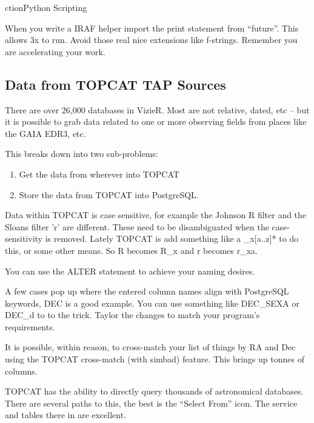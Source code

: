 ction{Python Scripting}

When you write a IRAF helper  import the
print statement from ``future''. This allows 3x to run. Avoid those
real nice extensions like f-strings.  Remember you are accelerating
your work.


\subsection{Data from TOPCAT TAP Sources}

There are over 26,000 databases in VizieR. Most are not
relative, dated, etc -- but it is possible to grab
data related to one or more observing fields from places
like the GAIA EDR3, etc. 

This breaks down into two sub-problems:

\vspace{-.15cm}
\begin{enumerate}\addtolength{\itemsep}{-0.5\baselineskip}
   \item   Get the data from wherever into TOPCAT
   \item   Store the data from TOPCAT into PostgreSQL.
\end{enumerate}


Data within TOPCAT is case sensitive, for example the Johnson R filter
and the Sloans filter 'r' are different.  These need to be
disambiguated when the case-sensitivity is removed. Lately TOPCAT is
add something like a \_x[a..z]* to do this, or some other means.
So R becomes R\_x and r becomes r\_xa. 

You can use the ALTER statement to achieve your naming desires.

A few cases pop up where the entered column names align with
PostgreSQL keywords, DEC is a good example. You can use
something like DEC\_SEXA or DEC\_d to to the trick. Taylor
the changes to match your program's requirements.

It is possible, within reason, to cross-match your list of
things by RA and Dec using the TOPCAT cross-match (with simbad)
feature. This brings up tonnes of columns. 

TOPCAT has the ability to directly query thousands of astronomical
databases. There are several paths to this, the best is the ``Select
From'' icon. The service and tables there in are excellent.

